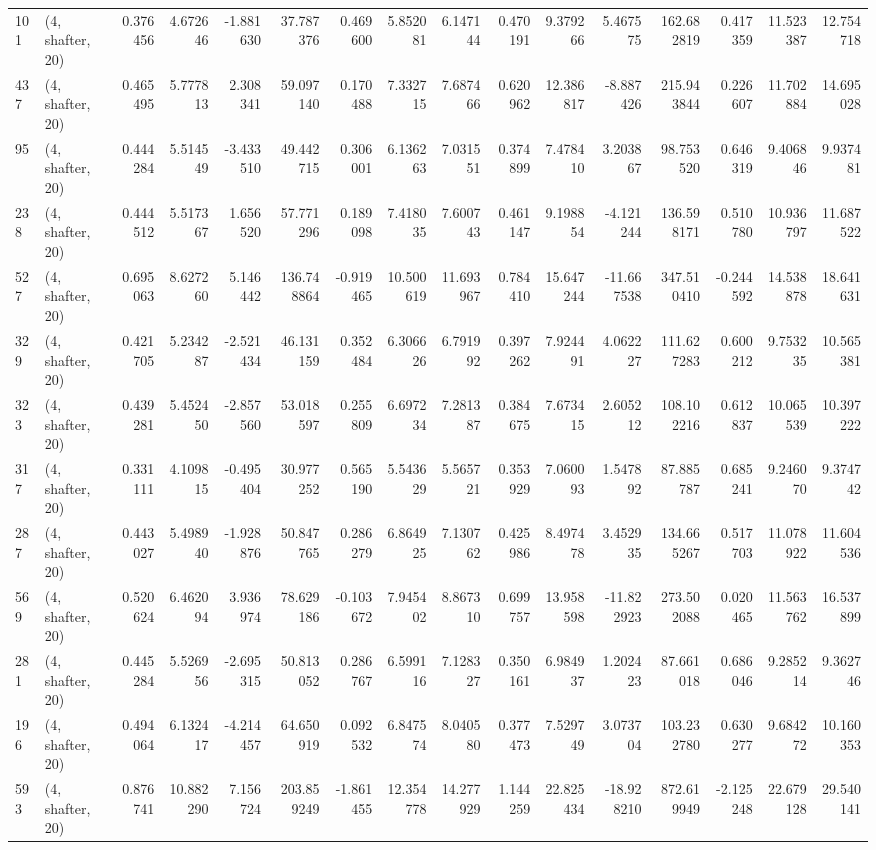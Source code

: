 \begin{tabular}{llrrrrrrrrrrrrrr}
101 &  (4, shafter, 20) &   0.376456 &   4.672646 &  -1.881630 &    37.787376 &   0.469600 &   5.852081 &   6.147144 &  0.470191 &   9.379266 &   5.467575 &   162.682819 &  0.417359 &  11.523387 &  12.754718 \\
437 &  (4, shafter, 20) &   0.465495 &   5.777813 &   2.308341 &    59.097140 &   0.170488 &   7.332715 &   7.687466 &  0.620962 &  12.386817 &  -8.887426 &   215.943844 &  0.226607 &  11.702884 &  14.695028 \\
95  &  (4, shafter, 20) &   0.444284 &   5.514549 &  -3.433510 &    49.442715 &   0.306001 &   6.136263 &   7.031551 &  0.374899 &   7.478410 &   3.203867 &    98.753520 &  0.646319 &   9.406846 &   9.937481 \\
238 &  (4, shafter, 20) &   0.444512 &   5.517367 &   1.656520 &    57.771296 &   0.189098 &   7.418035 &   7.600743 &  0.461147 &   9.198854 &  -4.121244 &   136.598171 &  0.510780 &  10.936797 &  11.687522 \\
527 &  (4, shafter, 20) &   0.695063 &   8.627260 &   5.146442 &   136.748864 &  -0.919465 &  10.500619 &  11.693967 &  0.784410 &  15.647244 & -11.667538 &   347.510410 & -0.244592 &  14.538878 &  18.641631 \\
329 &  (4, shafter, 20) &   0.421705 &   5.234287 &  -2.521434 &    46.131159 &   0.352484 &   6.306626 &   6.791992 &  0.397262 &   7.924491 &   4.062227 &   111.627283 &  0.600212 &   9.753235 &  10.565381 \\
323 &  (4, shafter, 20) &   0.439281 &   5.452450 &  -2.857560 &    53.018597 &   0.255809 &   6.697234 &   7.281387 &  0.384675 &   7.673415 &   2.605212 &   108.102216 &  0.612837 &  10.065539 &  10.397222 \\
317 &  (4, shafter, 20) &   0.331111 &   4.109815 &  -0.495404 &    30.977252 &   0.565190 &   5.543629 &   5.565721 &  0.353929 &   7.060093 &   1.547892 &    87.885787 &  0.685241 &   9.246070 &   9.374742 \\
287 &  (4, shafter, 20) &   0.443027 &   5.498940 &  -1.928876 &    50.847765 &   0.286279 &   6.864925 &   7.130762 &  0.425986 &   8.497478 &   3.452935 &   134.665267 &  0.517703 &  11.078922 &  11.604536 \\
569 &  (4, shafter, 20) &   0.520624 &   6.462094 &   3.936974 &    78.629186 &  -0.103672 &   7.945402 &   8.867310 &  0.699757 &  13.958598 & -11.822923 &   273.502088 &  0.020465 &  11.563762 &  16.537899 \\
281 &  (4, shafter, 20) &   0.445284 &   5.526956 &  -2.695315 &    50.813052 &   0.286767 &   6.599116 &   7.128327 &  0.350161 &   6.984937 &   1.202423 &    87.661018 &  0.686046 &   9.285214 &   9.362746 \\
196 &  (4, shafter, 20) &   0.494064 &   6.132417 &  -4.214457 &    64.650919 &   0.092532 &   6.847574 &   8.040580 &  0.377473 &   7.529749 &   3.073704 &   103.232780 &  0.630277 &   9.684272 &  10.160353 \\
593 &  (4, shafter, 20) &   0.876741 &  10.882290 &   7.156724 &   203.859249 &  -1.861455 &  12.354778 &  14.277929 &  1.144259 &  22.825434 & -18.928210 &   872.619949 & -2.125248 &  22.679128 &  29.540141 \\
\bottomrule
\end{tabular}
